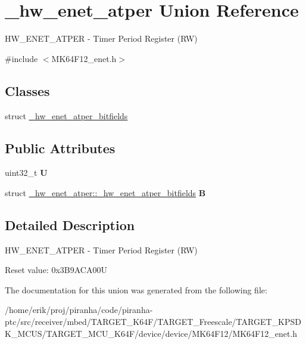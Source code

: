 \hypertarget{union__hw__enet__atper}{}\section{\+\_\+hw\+\_\+enet\+\_\+atper Union Reference}
\label{union__hw__enet__atper}


H\+W\+\_\+\+E\+N\+E\+T\+\_\+\+A\+T\+P\+ER -\/ Timer Period Register (RW)  




{\ttfamily \#include $<$M\+K64\+F12\+\_\+enet.\+h$>$}

\subsection*{Classes}
\begin{DoxyCompactItemize}
\item 
struct \hyperlink{struct__hw__enet__atper_1_1__hw__enet__atper__bitfields}{\+\_\+hw\+\_\+enet\+\_\+atper\+\_\+bitfields}
\end{DoxyCompactItemize}
\subsection*{Public Attributes}
\begin{DoxyCompactItemize}
\item 
uint32\+\_\+t {\bfseries U}\hypertarget{union__hw__enet__atper_a30f759458069d6c6e9ba9a4233132fa9}{}\label{union__hw__enet__atper_a30f759458069d6c6e9ba9a4233132fa9}

\item 
struct \hyperlink{struct__hw__enet__atper_1_1__hw__enet__atper__bitfields}{\+\_\+hw\+\_\+enet\+\_\+atper\+::\+\_\+hw\+\_\+enet\+\_\+atper\+\_\+bitfields} {\bfseries B}\hypertarget{union__hw__enet__atper_a46b5d1cf8af0cd459ab7a43034d2fffb}{}\label{union__hw__enet__atper_a46b5d1cf8af0cd459ab7a43034d2fffb}

\end{DoxyCompactItemize}


\subsection{Detailed Description}
H\+W\+\_\+\+E\+N\+E\+T\+\_\+\+A\+T\+P\+ER -\/ Timer Period Register (RW) 

Reset value\+: 0x3\+B9\+A\+C\+A00U 

The documentation for this union was generated from the following file\+:\begin{DoxyCompactItemize}
\item 
/home/erik/proj/piranha/code/piranha-\/ptc/src/receiver/mbed/\+T\+A\+R\+G\+E\+T\+\_\+\+K64\+F/\+T\+A\+R\+G\+E\+T\+\_\+\+Freescale/\+T\+A\+R\+G\+E\+T\+\_\+\+K\+P\+S\+D\+K\+\_\+\+M\+C\+U\+S/\+T\+A\+R\+G\+E\+T\+\_\+\+M\+C\+U\+\_\+\+K64\+F/device/device/\+M\+K64\+F12/M\+K64\+F12\+\_\+enet.\+h\end{DoxyCompactItemize}
